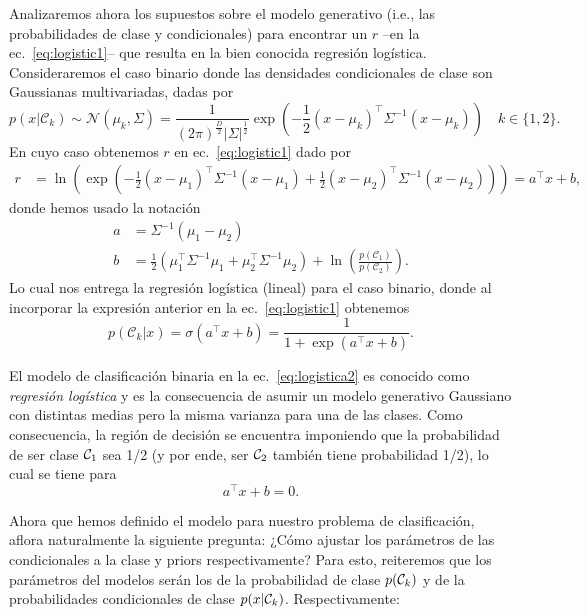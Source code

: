 Analizaremos ahora  los supuestos sobre el modelo generativo (i.e., las  probabilidades de clase y condicionales) para encontrar un $r$ --en la ec.~\eqref{eq:logistic1}-- que resulta en la bien conocida regresión logística. Consideraremos el caso binario donde las densidades condicionales de clase son Gaussianas multivariadas, dadas por
\begin{equation}
	p(x|\mathcal{C}_k) \sim \mathcal{N} (\mu_k,\Sigma) = \frac{1}{(2\pi)^\frac{D}{2}|\Sigma|^\frac{1}{2}}\exp(-\frac{1}{2}(x-\mu_k)^\top \Sigma^{-1}(x-\mu_k))\quad k\in\{1,2\}.
\end{equation}
En cuyo caso obtenemos $r$ en ec.~\eqref{eq:logistic1}  dado por
\begin{align}
r &= \ln\left(\exp\left(-\frac{1}{2}(x-\mu_1)^\top \Sigma^{-1}(x-\mu_1) +\frac{1}{2}(x-\mu_2)^\top \Sigma^{-1}(x-\mu_2)\right)\right)= a^\top x+b,
\end{align}
donde hemos usado la notación
\begin{align}
a &= \Sigma^{-1}(\mu_1-\mu_2)\\
b &= \frac{1}{2}(\mu_1^\top \Sigma^{-1}\mu_1+\mu_2^\top \Sigma^{-1}\mu_2)
+\ln\left(\frac{p(\mathcal{C}_1)}{p(\mathcal{C}_2)}\right). 
\end{align}
Lo cual nos entrega la regresión logística (lineal) para el  caso binario, donde al incorporar la expresión anterior en la ec.~\eqref{eq:logistic1} obtenemos
\begin{equation}
	p(\mathcal{C}_k|x) = \sigma(a^\top x+b) = \frac{1}{1 + \exp{\left(a^\top x+b\right)}}. \label{eq:logistica2}
\end{equation}

\begin{remark}\label{rem:reg_log} 
El modelo de clasificación binaria en la  ec.~\ref{eq:logistica2} es conocido como \emph{regresión logística} y es la consecuencia de asumir un modelo generativo Gaussiano con distintas medias pero la misma varianza para una de las clases. Como consecuencia, la región de decisión se encuentra imponiendo que la probabilidad de ser clase ${\mathcal C}_1$ sea 1/2 (y por ende, ser ${\mathcal C}_2$ también tiene probabilidad 1/2), lo cual se tiene para 
\begin{equation}
	a^\top x+b = 0.
\end{equation}
\end{remark}

Ahora que hemos definido el modelo para nuestro problema de clasificación, aflora naturalmente la siguiente pregunta: ¿Cómo ajustar los parámetros de las condicionales a la clase y priors respectivamente? Para esto, reiteremos que los parámetros del modelos serán los de la probabilidad de clase $p({\mathcal C}_k)$ y de la probabilidades condicionales de clase $p(x|{\mathcal C}_k)$. Respectivamente: 

